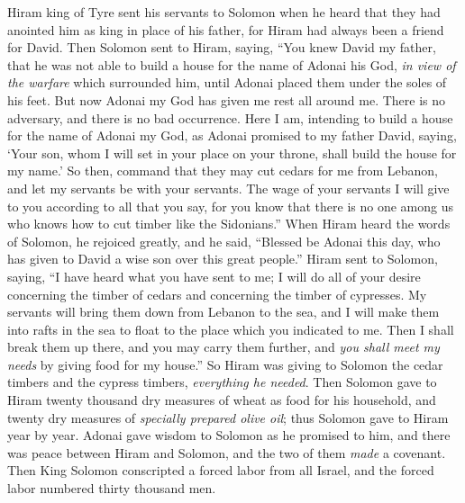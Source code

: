 \begin{biblechapter} %
 Hiram king of Tyre sent his servants to Solomon when he heard that they had anointed him as king in place of his father, for Hiram had always been a friend for David.
\verse Then Solomon sent to Hiram, saying,
\verse “You knew David my father, that he was not able to build a house for the name of Adonai his God, \textit{in view of the warfare} which surrounded him, until Adonai placed them under the soles of his feet.
\verse But now Adonai my God has given me rest all around me. There is no adversary, and there is no bad occurrence.
\verse Here I am, intending to build a house for the name of Adonai my God, as Adonai promised to my father David, saying, ‘Your son, whom I will set in your place on your throne, shall build the house for my name.’
\verse So then, command that they may cut cedars for me from Lebanon, and let my servants be with your servants. The wage of your servants I will give to you according to all that you say, for you know that there is no one among us who knows how to cut timber like the Sidonians.”
\verse When Hiram heard the words of Solomon, he rejoiced greatly, and he said, “Blessed be Adonai this day, who has given to David a wise son over this great people.”
\verse Hiram sent to Solomon, saying, “I have heard what you have sent to me; I will do all of your desire concerning the timber of cedars and concerning the timber of cypresses.
\verse My servants will bring them down from Lebanon to the sea, and I will make them into rafts in the sea to float to the place which you indicated to me. Then I shall break them up there, and you may carry them further, and \textit{you shall meet my needs} by giving food for my house.”
\verse So Hiram was giving to Solomon the cedar timbers and the cypress timbers, \textit{everything he needed}.
\verse Then Solomon gave to Hiram twenty thousand dry measures of wheat as food for his household, and twenty dry measures of \textit{specially prepared olive oil}; thus Solomon gave to Hiram year by year.
\verse Adonai gave wisdom to Solomon as he promised to him, and there was peace between Hiram and Solomon, and the two of them \textit{made} a covenant.
\verse Then King Solomon conscripted a forced labor from all Israel, and the forced labor numbered thirty thousand men.

\end{biblechapter}
